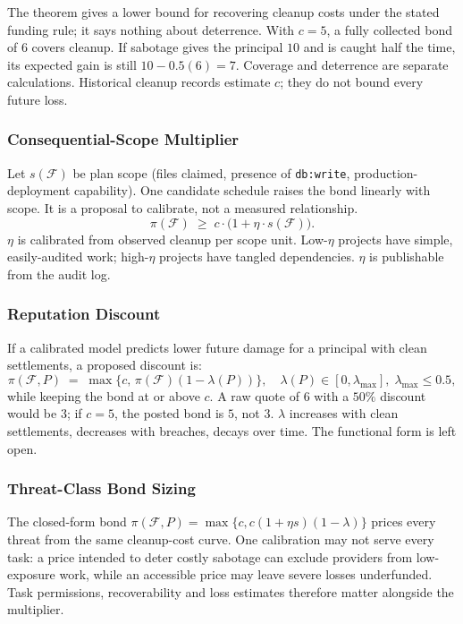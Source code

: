 \documentclass[11pt,a4paper]{article}
\theoremstyle{definition}
\theoremstyle{remark}
\begin{document}
The theorem gives a lower bound for recovering cleanup costs under the stated
funding rule; it says nothing about deterrence. With $c=5$, a fully collected
bond of $6$ covers cleanup. If sabotage
gives the principal $10$ and is caught half the time, its expected gain is
still $10-0.5(6)=7$. Coverage and deterrence are separate calculations.
Historical cleanup records estimate $c$; they do not bound every future loss.

\subsubsection{Consequential-Scope Multiplier}\label{sec:scope-multiplier}

Let $s(\mathcal{F})$ be plan scope (files claimed, presence of \texttt{db:write}, production-deployment capability). One candidate schedule raises the bond linearly with scope.
It is a proposal to calibrate, not a measured relationship.
\[
\pi(\mathcal{F}) \;\geq\; c \cdot \bigl(1 + \eta \cdot s(\mathcal{F})\bigr).
\]
$\eta$ is calibrated from observed cleanup per scope unit. Low-$\eta$ projects have simple, easily-audited work; high-$\eta$ projects have tangled dependencies. $\eta$ is publishable from the audit log.

\subsubsection{Reputation Discount}\label{sec:rep-discount}

If a calibrated model predicts lower future damage for a principal with
clean settlements, a proposed discount is:
\[
\pi(\mathcal{F}, P) \;=\; \max\{c,\,\pi(\mathcal{F})(1-\lambda(P))\},
\quad \lambda(P) \in [0, \lambda_{\max}],\; \lambda_{\max} \leq 0.5,
\]
while keeping the bond at or above $c$. A raw quote of $6$ with a $50\%$
discount would be $3$; if $c=5$, the posted bond is $5$, not $3$. $\lambda$ increases with clean settlements, decreases with breaches, decays over time. The functional form is left open.

\subsubsection{Threat-Class Bond Sizing}\label{sec:pricing:threats}

The closed-form bond $\pi(\mathcal{F}, P) = \max\{c,c(1 + \eta s)(1 - \lambda)\}$ prices every threat from the same cleanup-cost curve. One calibration may not serve every task: a price intended to deter costly sabotage can exclude providers from low-exposure work, while an accessible price may leave severe losses underfunded. Task permissions, recoverability and loss estimates therefore matter alongside the multiplier.
\end{document}
